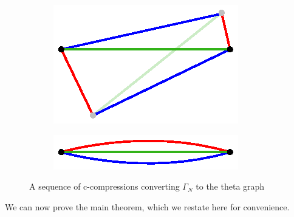 \documentclass[11pt, oneside]{amsart}
\theoremstyle{theorem}
\theoremstyle{definition}
\theoremstyle{theorem}
\begin{document}
\begin{figure}[h!]
\begin{subfigure}{.24\textwidth}
    \label{nx5}
\end{subfigure}%
\begin{subfigure}{.24\textwidth}
  \centering
  \includegraphics[width=.9\linewidth]{nonex6.eps}
  \label{nx6}
\end{subfigure}
\begin{subfigure}{.24\textwidth}
  \centering
  \includegraphics[width=.9\linewidth]{nonex7.eps}
  \label{nx7}
\end{subfigure}%
\caption{A sequence of c-compressions converting $\Gamma_N$ to the theta graph}
\label{nx}
\end{figure}




We can now prove the main theorem, which we restate here for convenience.
\end{document}

